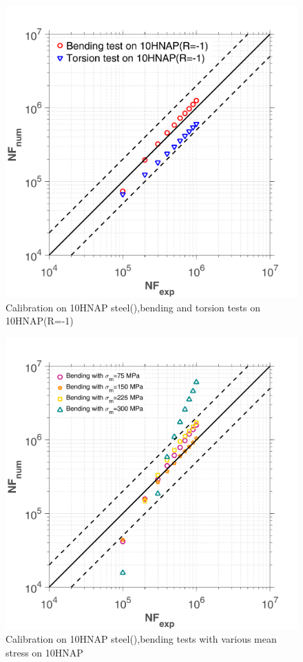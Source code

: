 \documentclass[3p,times,number,review]{elsarticle}
\begin{document}
\begin{figure}[!h]
	\centering
	\includegraphics[width=\textwidth]{figures//10HNAP_bt1D_err.png} 
	\caption{Calibration on 10HNAP steel(\cite{jabbado:pastel-00002116}),bending and torsion tests on 10HNAP(R=-1)}
	\label{fig.10HNAP1}
\end{figure}
\begin{figure}[!h]
	\centering
	\includegraphics[width=\textwidth]{figures//10HNAP_b1D_m_err.png} 
	\caption{Calibration on 10HNAP steel(\cite{jabbado:pastel-00002116}),bending tests with various mean stress on 10HNAP}
	\label{fig.10HNAP2}
\end{figure}
\end{document}
